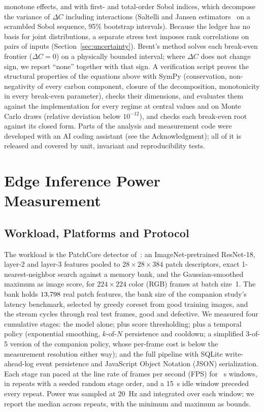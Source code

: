 monotone effects, and with first- and total-order Sobol indices, which decompose the variance of $\Delta C$ including interactions (Saltelli and Jansen estimators~\cite{saltelli2010variance,jansen1999analysis} on a scrambled Sobol sequence, 95\% bootstrap intervals). Because the ledger has no basis for joint distributions, a separate stress test imposes rank correlations on pairs of inputs (Section~\ref{sec:uncertainty}). Brent's method solves each break-even frontier ($\Delta C=0$) on a physically bounded interval; where $\Delta C$ does not change sign, we report ``none'' together with that sign. A verification script proves the structural properties of the equations above with SymPy (conservation, non-negativity of every carbon component, closure of the decomposition, monotonicity in every break-even parameter), checks their dimensions, and evaluates them against the implementation for every regime at central values and on Monte Carlo draws (relative deviation below $10^{-12}$), and checks each break-even root against its closed form. Parts of the analysis and measurement code were developed with an AI coding assistant (see the Acknowledgment); all of it is released and covered by unit, invariant and reproducibility tests.







\section{Edge Inference Power Measurement}
\label{sec:measure}
\subsection{Workload, Platforms and Protocol}
The workload is the PatchCore detector of~\cite{sengar2026paperA}: an ImageNet-pretrained ResNet-18, layer-2 and layer-3 features pooled to $28\times28\times384$ patch descriptors, exact 1-nearest-neighbor search against a memory bank, and the Gaussian-smoothed maximum as image score, for $224\times224$ color (RGB) frames at batch size~1. The bank holds $13{,}798$ real patch features, the bank size of the companion study's latency benchmark, selected by greedy coreset from \BenchFitImages{} good \BenchCategory{} training images, and the stream cycles through \BenchFrames{} real \BenchCategory{} test frames, good and defective. We measured four cumulative stages: the model alone; plus score thresholding; plus a temporal policy (exponential smoothing, $k$-of-$N$ persistence and cooldown; a simplified 3-of-5 version of the companion policy, whose per-frame cost is below the measurement resolution either way); and the full pipeline with SQLite write-ahead-log event persistence and JavaScript Object Notation (JSON) serialization. Each stage ran paced at the line rate of \BenchFps{} frames per second (FPS) for \BenchWindow~s windows, in \BenchRepeats{} repeats with a seeded random stage order, and a 15~s idle window preceded every repeat. Power was sampled at 20~Hz and integrated over each window; we report the median across repeats, with the minimum and maximum as bounds.

